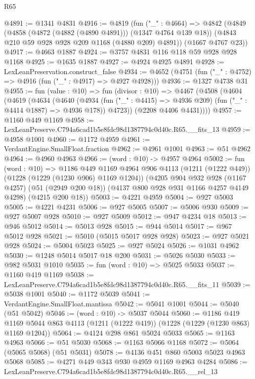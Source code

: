 \begin{lexlean}{R65}
\begin{coremodule}
@4891 := @1341 @4831
@4916 := @4819
    (fun ("_" : @4664) =>
    @4842
      (@4849
        (@4858 (@4872 (@4882 (@4890 @4891))) (@1347 @4764 @139 @18))
        (@4843 @210 @59 @928 @928 @209 @1168 (@4880 @209) @4891))
      (@1667 @4767 @23))
@4917 := @4663 @1887
@4924 := @3757 @4831 @116 @118 @59 @928 @928 @1168
@4925 := @1635 @1887
@4927 := @4924 @4925 @4891
@4928 := LexLeanPreservation.construct_false
@4934 := @4652 (@4751 (fun ("_" : @4752) => @4916 (fun ("_" : @4917) => @4927 @4928)))
@4936 := @1327 @4738 @31
@4955 := fun (value : @10) =>
  fun (divisor : @10) =>
  @4467
    (@4508
      (@4604
        (@4619
          (@4634
            (@4640
              (@4934 (fun ("_" : @4415) => @4936 @209) (fun ("_" : @4414 @1887) => @4936 @178))
              @4723))
          (@2208 @4406 @4431))))
@4957 := @1160 @449 @1169
@4958 := LexLeanPreserve.C794a6cad1b5e8fdc98d1387794c0d40c.R65.__fits_13
@4959 := @4958 @1001
@4960 := @1172 @4959
@4961 := VerdantEngine.SmallFloat.fraction
@4962 := @4961 @1001
@4963 := @51 @4962
@4964 := @4960 @4963
@4966 := (word : @10) -> @4957 @4964
@5002 := fun (word : @10) =>
  @1186
    @449
    @1169
    @4964
    @906
    @4113
    (@1211 (@1222 @449))
    (@1228 (@1229 (@1230 @906) @1169 @1204))
    (@4205
      @904
      @932
      @928
      (@1167 @4257)
      (@51 (@2949 @200 @18))
      (@4137 @800 @928 @931 @1166 @4257 @4149 @4298)
      (@4215 @200 @18))
@5003 := @4221 @4959
@5004 := @927 @5003
@5005 := @4221 @4231
@5006 := @927 @5005
@5007 := @5006 @930
@5009 := @927 @5007 @928
@5010 := @927 @5009
@5012 := @947 @4234 @18
@5013 := @946 @5012
@5014 := @5013 @928
@5015 := @944 @5014
@5017 := @967 @5012 @928
@5021 := @5010 (@5015 @5017 @928 @928)
@5023 := @927 @5021 @928
@5024 := @5004 @5023
@5025 := @927 @5024
@5026 := @1031 @4962
@5030 := @1248 @5014 @5017 @18 @200
@5031 := @5026 @5030
@5033 := @982 @5031 @1010
@5035 := fun (word : @10) => @5025 @5033
@5037 := @1160 @419 @1169
@5038 := LexLeanPreserve.C794a6cad1b5e8fdc98d1387794c0d40c.R65.__fits_11
@5039 := @5038 @1001
@5040 := @1172 @5039
@5041 := VerdantEngine.SmallFloat.mantissa
@5042 := @5041 @1001
@5044 := @5040 (@51 @5042)
@5046 := (word : @10) -> @5037 @5044
@5060 := @1186
    @419
    @1169
    @5044
    @863
    @4113
    (@1211 (@1222 @419))
    (@1228 (@1229 (@1230 @863) @1169 @1204))
@5064 := @4124 @298 @861 @5024 @5033
@5065 := @1163 @4963
@5066 := @51 @5030
@5068 := @1163 @5066 @1168
@5072 := @5064 (@5065 @5068) (@51 @5031)
@5078 := @4136 @451 @860 @5003 @5023 @4963 @5068
@5085 := @4271 @449 @343 @930 @4959 @1169 @4963 @4284
@5086 := LexLeanPreserve.C794a6cad1b5e8fdc98d1387794c0d40c.R65.__rel_13

\end{coremodule}
\end{lexlean}
